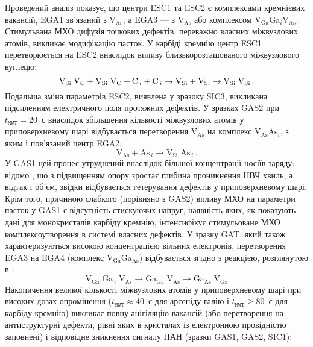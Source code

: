 Проведений аналіз показує, що центри ESC1 та ESC2 є комплексами кремнієвих вакансій, EGA1 зв'язаний з V$_\text{As}$, а EGA3 --- з V$_\text{As}$ або комплексом V$_\text{Ga}$Ga$_i$V$_\text{As}$.
Стимульвана МХО дифузія точкових дефектів, переважно власних міжвузлових атомів, викликає модифікацію пасток.
У карбіді кремнію центр ESC1 перетворюється на ESC2 внаслідок впливу близькорозташованого міжвузлового вуглецю:
\begin{equation*}
  \text{V}_\text{Si}\;\text{V}_\text{C}+\text{V}_\text{Si}\;\text{V}_\text{C}+\text{C}_{\,i}+ \text{C}_{\,i} \rightarrow \text{V}_\text{Si}+ \text{V}_\text{Si}\rightarrow \text{V}_\text{Si}\;\text{V}_\text{Si}\,.\\
\end{equation*}
Подальша зміна параметрів ESC2, виявлена у зразоку SIC3, викликана підсиленням електричного поля протяжних дефектів.
У зразках GAS2 при $t_\mathtt{MWT}=20$~с внаслідок збільшення кількості міжвузлових атомів у приповерхневому шарі
відбувається перетворення V$_\text{As}$ на комплекс V$_\text{As}$As$_i$, з яким і пов'язаний центр EGA2:
\begin{equation*}
\text{V}_\text{As}+ \text{As}_{\,i} \rightarrow\text{V}_\text{Si}\;\text{As}_{\,i}\,.
\end{equation*}
У GAS1 цей процес утруднений внаслідок більшої концентрації носіїв заряду:
відомо \cite{ZOHM2000}, що з підвищенням опору зростає глибина проникнення НВЧ хвиль, а відтак і об'єм, звідки відбувається гетерування дефектів у приповерхневому шарі.
Крім того, причиною слабкого (порівняно з GAS2) впливу МХО на параметри пасток у GAS1 є відсутність стискуючих напруг,
наявність яких, як показують дані для монокристалів карбіду кремнію, інтенсифікує стимульоване МХО комплексоутворення в системі власних дефектів.
У зразку GAT, який також характеризуються високою концентрацією вільних електронів,
перетворення EGA3 на EGA4 (комплекс V$_\text{Ga}$Ga$_\text{As}$) відбувається згідно з реакцією, розглянутою в \cite{FANG1990}:
\begin{equation*}
  \text{V}_\text{Ga}\;\text{Ga}_{\,i}\;\text{V}_\text{As}\rightarrow \text{Ga}_\text{Ga}\;\text{V}_\text{As}
  \rightarrow \text{Ga}_\text{As}\;\text{V}_\text{Ga}
\end{equation*}
Накопичення великої кількості міжвузлових атомів у приповерхневому шарі при високих дозах опромінення ($t_\mathtt{MWT}\approx40$~с для арсеніду галію і $t_\mathtt{MWT}\geq80$~с для карбіду кремнію) викликає повну анігіляцію вакансій (або перетворення на антиструктурні дефекти, рівні яких в кристалах із електронною провідністю заповнені) і відповідне зникнення сигналу ПАН (зразки GAS1, GAS2, SIC1):

